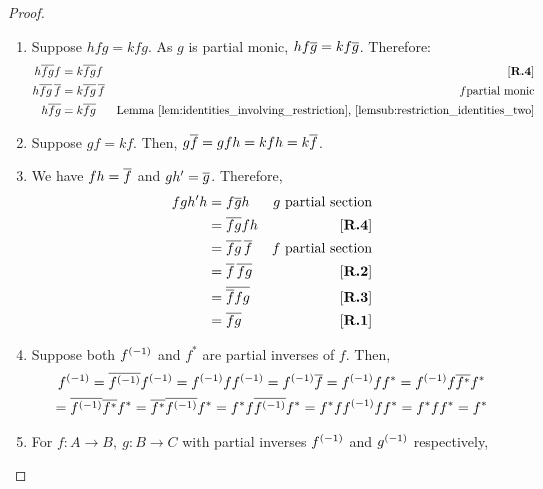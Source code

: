 \begin{proof}
  \prepprooflist
  \begin{enumerate}[{(}i{)}]
    \item Suppose $h f g = k f g$. As $g$ is partial monic, $h f \overline{g} = k f \overline{g}$. 
      Therefore:
      \begin{align*}
        h \overline{f g} f &= k \overline{f g} f &[\text{\bfseries {R}.{4}}]\\
        h \overline{f g}\,\overline{f} &= k \overline{f g}\, \overline{f} & f\text{partial monic}\\
        h \overline{fg}&= k \overline{fg} & \text{Lemma \ref{lem:identities_involving_restriction}, 
          \ref{lemsub:restriction_identities_two}}
      \end{align*}
    \item Suppose $g f = k f$. Then, $g\overline{f} = g f h = k f h = k \overline{f}$.
    \item We have $f h = \overline{f}$ and $g h' = \overline{g}$. Therefore,
      \begin{align*}
        f g h' h &= f \overline{g} h & g \text{ partial section}\\
        &= \overline{f g} f h & [\text{\bfseries {R}.{4}}]\\
        &= \overline{f g}\, \overline{f} & f \text{ partial section}\\
        &= \overline{f}\, \overline{f g} & [\text{\bfseries {R}.{2}}]\\
        &= \overline{\overline{f}f g} & [\text{\bfseries {R}.{3}}]\\
        &= \overline{f g} & [\text{\bfseries {R}.{1}}]
      \end{align*}
    \item Suppose both ${f}^{(-1)}$ and $f^*$ are partial inverses of $f$. Then,
      \begin{multline*}
        \inv{f}
        = \restr{\inv{f}}\inv{f} %
        =\inv{f}f\inv{f}  %
        = \inv{f} \restr{f}   %
        = \inv{f} f f^*   %
        = \inv{f} f \restr{f^*} f^*  \\ %
        = \restr{\inv{f}}\restr{f^*} f^*   %
        = \restr{f^*}\restr{\inv{f}} f^* %
        = f^* f \restr{\inv{f}}  f^* %
        = f^* f \inv{f} f f^* %
        = f^* f f^* %
        = f^* %
      \end{multline*}
    \item For $f:A\to B,\ g:B\to C$ with partial inverses ${f}^{(-1)}$ and ${g}^{(-1)}$ respectively, 

\end{enumerate}
\end{proof}
